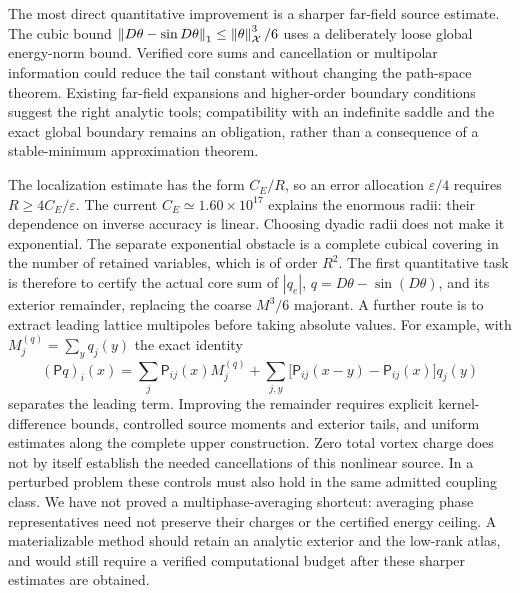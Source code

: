 The most direct quantitative improvement is a sharper far-field source estimate. The cubic bound $\left\lVert D\theta-\sin D\theta\right\rVert_1\le\left\lVert\theta\right\rVert_\mathcal X^3/6$ uses a deliberately loose global energy-norm bound. Verified core sums and cancellation or multipolar information could reduce the tail constant without changing the path-space theorem. Existing far-field expansions and higher-order boundary conditions \cite{Braun2022,Braun2025,Wei2026} suggest the right analytic tools; compatibility with an indefinite saddle and the exact global boundary remains an obligation, rather than a consequence of a stable-minimum approximation theorem.

The localization estimate has the form $C_E/R$, so an error allocation
$\varepsilon/4$ requires $R\ge4C_E/\varepsilon$. The current
$C_E\simeq1.60\times10^{17}$ explains the enormous radii: their dependence
on inverse accuracy is linear. Choosing dyadic radii does not make it
exponential. The separate exponential obstacle is a complete cubical
covering in the number of retained variables, which is of order $R^2$.
The first quantitative task is therefore to certify the actual core sum
of $|q_e|$, $q=D\theta-\sin(D\theta)$, and its exterior remainder,
replacing the coarse $M^3/6$ majorant. A further route is to extract
leading lattice multipoles before taking absolute values. For example,
with $M_j^{(q)}=\sum_yq_j(y)$ the exact identity
\[
 (\mathsf Pq)_i(x)=\sum_j\mathsf P_{ij}(x)M_j^{(q)}
 +\sum_{j,y}\bigl[\mathsf P_{ij}(x-y)-\mathsf P_{ij}(x)\bigr]q_j(y)
\]
separates the leading term. Improving the remainder requires explicit
kernel-difference bounds, controlled source moments and exterior tails,
and uniform estimates along the complete upper construction. Zero total
vortex charge does not by itself establish the needed cancellations of
this nonlinear source. In a perturbed problem these controls must also
hold in the same admitted coupling class. We have not proved a
multiphase-averaging shortcut: averaging phase representatives need not
preserve their charges or the certified energy ceiling. A materializable
method should retain an analytic exterior and the low-rank atlas, and
would still require a verified computational budget after these sharper
estimates are obtained.

